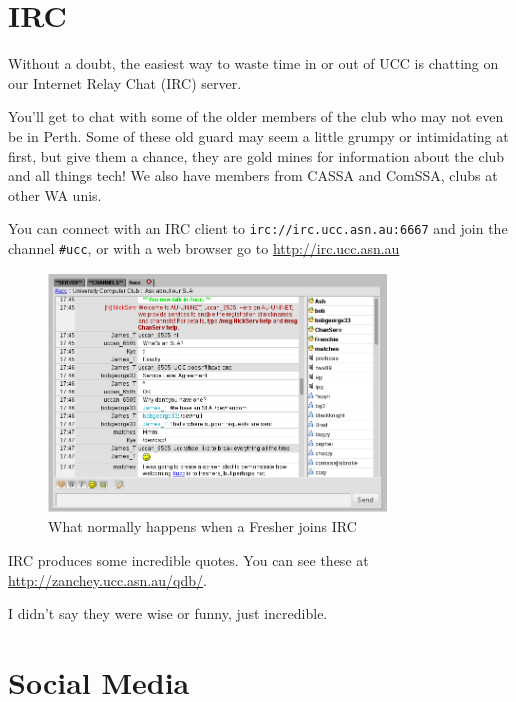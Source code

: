 \pagebreak
\section{IRC}


\begin{mdframed}
Without a doubt, the easiest way to waste time in or out of UCC 
is chatting on our Internet Relay Chat (IRC) server. 

You'll get to chat with some of the older members of the club who 
may not even be in Perth. Some of these old guard may seem a 
little grumpy or intimidating at first, but give them a chance, they 
are gold mines for information about the club and all things tech! 
We also have members from CASSA and ComSSA, clubs at other WA unis. 

You can connect with an IRC client to \texttt{irc://irc.ucc.asn.au:6667} 
and join the channel \texttt{\#ucc}, or with a web browser go to 
\url{http://irc.ucc.asn.au}

\begin{figure}[H]
	\centering
	\includegraphics[width=0.8\textwidth]{figures/webirc.png}
	\caption{What normally happens when a Fresher joins IRC}
	\label{webirc.jpg}
\end{figure}

IRC produces some incredible quotes. You can see these at \url{http://zanchey.ucc.asn.au/qdb/}.

I didn't say they were wise or funny, just incredible.

\end{mdframed}

\section{Social Media}

